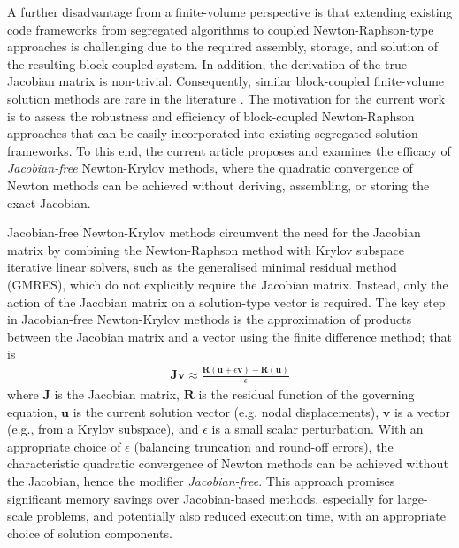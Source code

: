 \documentclass[sn-mathphys,Numbered]{sn-jnl}%
\newcommand{\bb}{\boldsymbol}
\begin{document}
A further disadvantage from a finite-volume perspective is that extending existing code frameworks from segregated algorithms to coupled Newton-Raphson-type approaches is challenging due to the required assembly, storage, and solution of the resulting block-coupled system.
In addition, the derivation of the true Jacobian matrix is non-trivial.
Consequently, similar block-coupled finite-volume solution methods are rare in the literature \citep{Das2011, Cardiff2016, Castrillo2024}.
The motivation for the current work is to assess the robustness and efficiency of block-coupled Newton-Raphson approaches that can be easily incorporated into existing segregated solution frameworks.
To this end, the current article proposes and examines the efficacy of \emph{Jacobian-free} Newton-Krylov methods, where the quadratic convergence of Newton methods can be achieved without deriving, assembling, or storing the exact Jacobian.

Jacobian-free Newton-Krylov methods circumvent the need for the Jacobian matrix by combining the Newton-Raphson method with Krylov subspace iterative linear solvers, such as the generalised minimal residual method (GMRES), which do not explicitly require the Jacobian matrix.
Instead, only the action of the Jacobian matrix on a solution-type vector is required.
The key step in Jacobian-free Newton-Krylov methods is the approximation of products between the Jacobian matrix and a vector using the finite difference method; that is
\begin{eqnarray}
	\bb{J} \bb{v} \approx \frac{\bb{R}(\bb{u} + \epsilon \bb{v}) - \bb{R}(\bb{u})}{\epsilon}
\end{eqnarray}
where $\bb{J}$ is the Jacobian matrix, $\bb{R}$ is the residual function of the governing equation, $\mathbf{u}$ is the current solution vector (e.g. nodal displacements), $\mathbf{v}$ is a vector (e.g., from a Krylov subspace), and $\epsilon$ is a small scalar perturbation.
With an appropriate choice of $\epsilon$ (balancing truncation and round-off errors), the characteristic quadratic convergence of Newton methods can be achieved without the Jacobian, hence the modifier \emph{Jacobian-free}.
This approach promises significant memory savings over Jacobian-based methods, especially for large-scale problems, and potentially also reduced execution time, with an appropriate choice of solution components.
\end{document}
